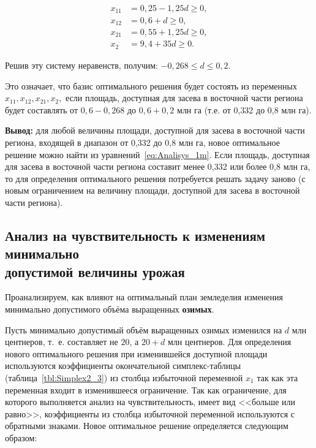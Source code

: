 \begin{equation}
    \begin{aligned}
      x_{11} &= 0{,}25 - 1{,}25d \ge 0, \\
      x_{12} &= 0{,}6 + d \ge 0, \\
      x_{21} &= 0{,}55 + 1{,}25d \ge 0, \\
      x_{2} &= 9{,}4 + 35d \ge 0.
    \end{aligned}
\end{equation}

Решив эту систему неравенств, получим: $ -0{,}268 \le d \le 0{,}2 $.

Это означает, что базис оптимального решения будет состоять из переменных 
$ x_{11}, x_{12}, x_{21}, x_{2}, $ если площадь, доступная для засева в восточной
части региона будет составлять от $ 0{,}6 - 0{,}268 $ до $ 0{,}6 + 0{,}2 $ млн га
(т.е. от 0{,}332 до 0{,}8 млн га).

\textbf{Вывод:}
для любой величины площади, доступной для засева в восточной
части региона, входящей в диапазон от 0{,}332 до 0{,}8 млн га, новое оптимальное решение можно найти
из уравнений~\eqref{eq:Analisys_1m}.
Если площадь, доступная для засева в восточной
части региона составит менее 0{,}332 или более 0{,}8 млн га, то для
определения оптимального решения потребуется решать задачу заново (с
новым ограничением на величину площади, доступной для засева в восточной
части региона).

\subsection{Анализ на чувствительность к изменениям минимально \\
  допустимой величины урожая}

Проанализируем, как влияют на оптимальный план земледелия изменения минимально допустимого
объёма выращенных \textbf{озимых}.

Пусть минимально допустимый объём выращенных озимых изменился на
$ d $ млн центнеров, т.~е. составляет не $ 20 $, а $ 20 + d $ млн центнеров. 
Для определения нового оптимального решения при изменившейся доступной площади
используются коэффициенты окончательной симплекс-таблицы (таблица~\ref{tbl:Simplex2_3})
из столбца избыточной переменной $ x_{1} $ так как эта переменная входит в изменившееся ограничение.
Так как ограничение, для которого выполняется анализ на чувствительность, имеет вид <<больше или равно>>,
коэффициенты из столбца избыточной переменной используются с обратными знаками.
Новое оптимальное решение определяется следующим образом:

